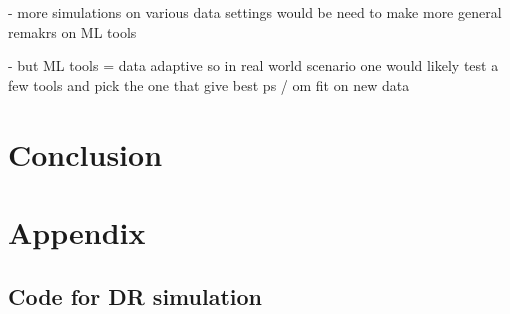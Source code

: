 \documentclass[12pt,twoside]{article}
\begin{document}
- more simulations on various data settings would be need to make more general remakrs on ML tools

- but ML tools = data adaptive so in real world scenario one would likely test a few tools and pick the one that give best ps / om fit on new data 

\section{Conclusion}

\clearpage



\clearpage
\section*{Appendix}

\subsection*{Code for DR simulation}


\end{document}
